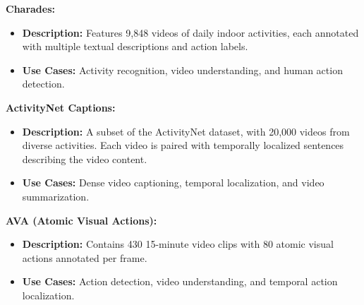 \textbf{Charades:}
\begin{itemize}
\item \textbf{Description:} Features 9,848 videos of daily indoor activities, each annotated with multiple textual descriptions and action labels.
\item \textbf{Use Cases:} Activity recognition, video understanding, and human action detection.
\end{itemize}

\textbf{ActivityNet Captions:}
\begin{itemize}
\item \textbf{Description:} A subset of the ActivityNet dataset, with 20,000 videos from diverse activities. Each video is paired with temporally localized sentences describing the video content.
\item \textbf{Use Cases:} Dense video captioning, temporal localization, and video summarization.
\end{itemize}

\textbf{AVA (Atomic Visual Actions):}
\begin{itemize}
\item \textbf{Description:} Contains 430 15-minute video clips with 80 atomic visual actions annotated per frame.
\item \textbf{Use Cases:} Action detection, video understanding, and temporal action localization.
\end{itemize}